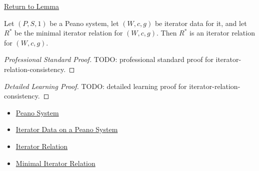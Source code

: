 \newpage
{}
\label{prf:iterator-relation-consistency}

\begin{remark*}[Return]
\hyperref[lem:iterator-relation-consistency]{Return to Lemma}
\end{remark*}

\begin{remark*}
\end{remark*}

\begin{lemma*}
Let $(P,S,1)$ be a Peano system, let $(W,c,g)$ be iterator data for it, and let
$R^*$ be the minimal iterator relation for $(W,c,g)$. Then $R^*$ is an
iterator relation for $(W,c,g)$.
\end{lemma*}

\begin{proof}[Professional Standard Proof]
\LRAProofBodyStart
TODO: professional standard proof for iterator-relation-consistency.
\end{proof}

\begin{proof}[Detailed Learning Proof]
\LRAProofBodyStart
TODO: detailed learning proof for iterator-relation-consistency.
\end{proof}

\begin{remark*}
\end{remark*}

\begin{dependencies}
\begin{itemize}
  \item \hyperref[def:peano-system]{Peano System}
  \item \hyperref[def:iterator-data-on-peano-system]{Iterator Data on a Peano System}
  \item \hyperref[def:iterator-relation]{Iterator Relation}
  \item \hyperref[def:minimal-iterator-relation]{Minimal Iterator Relation}
\end{itemize}
\end{dependencies}

\clearpage
